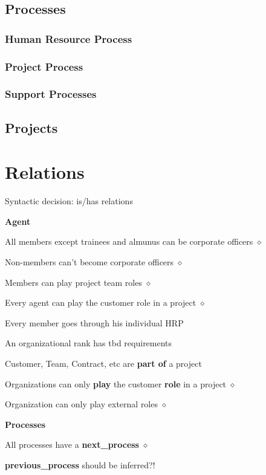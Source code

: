 \documentclass[a4paper, DIV=13, BCOR=0cm]{scrbook}
\begin{document}
\subsection{Processes}

\subsubsection{Human Resource Process}
\subsubsection{Project Process}
\subsubsection{Support Processes}
\subsection{Projects}

\section{Relations}

Syntactic decision: is/has relations


\textbf{Agent}
\begin{compactitem}
	\item All members except trainees and almunus can be corporate officers $\diamond$
	\item Non-members can't become corporate officers $\diamond$
	\item Members can play project team roles $\diamond$
	\item Every agent can play the customer role in a project $\diamond$
	\item Every member goes through his individual HRP
	\item An organizational rank has tbd requirements
	\item Customer, Team, Contract, etc are \textbf{part of} a project
	\item Organizations can only \textbf{play} the customer \textbf{role} in a project $\diamond$
	\item Organization can only play external roles $\diamond$
\end{compactitem}

\textbf{Processes}
\begin{compactitem}
	\item All processes have a \textbf{next\_process} $\diamond$
	\item \textbf{previous\_process} should be inferred?!
	\item
\end{compactitem}
\end{document}
